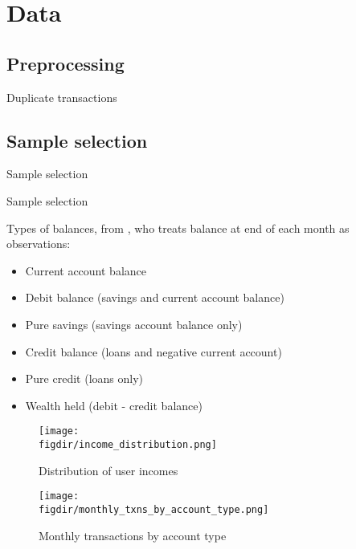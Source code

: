 
\section{Data}%
\label{sec:data}

\subsection{Preprocessing}%
\label{sub:preprocessing}

Duplicate transactions


\subsection{Sample selection}%
\label{sub:sample_selection}


\begin{table}[ht]
\caption{Sample selection}\label{tab:selection}

\end{table}


\begin{table}[ht]
\caption{Sample selection}\label{tab:selection}

\end{table}



Types of balances, from \citet{becker2017does}, who treats balance at end of
each month as observations:

\begin{itemize}
    \item Current account balance
    \item Debit balance (savings and current account balance)
    \item Pure savings (savings account balance only)
    \item Credit balance (loans and negative current account)
    \item Pure credit (loans only)
    \item Wealth held (debit - credit balance)
\end{itemize}


\begin{figure}[h]\center
    \caption{Distribution of user incomes}    
    \label{fig:income_distr}
    \texttt{[image: \\figdir/income\_distribution.png]}
\end{figure}

\begin{figure}[h]\center
    \newcommand\width{.9\textwidth}
    \caption{Monthly transactions by account type}    
    \label{fig:monthly_txns}
    \texttt{[image: \\figdir/monthly\_txns\_by\_account\_type.png]}
    \fignote{\width}{}
\end{figure}

